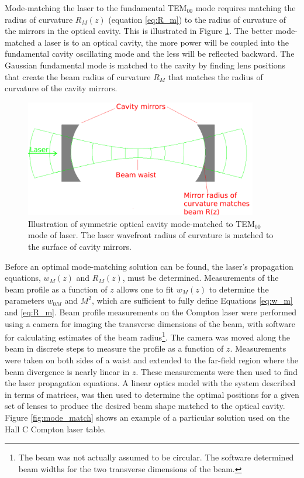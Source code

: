 Mode-matching the laser to the fundamental TEM$_{00}$ mode requires matching the radius of curvature $R_M(z)$ (equation \ref{eq:R_m}) to the radius of curvature of the mirrors in the optical cavity. This is illustrated in Figure \ref{fig:mode_matching}. The better mode-matched a laser is to an optical cavity, the more power will be coupled into the fundamental cavity oscillating mode and the less will be reflected backward. The Gaussian fundamental mode is matched to the cavity by finding lens positions that create the beam radius of curvature $R_M$ that matches the radius of curvature of the cavity mirrors.

\begin{figure}
\begin{center}
\includegraphics[width=4in]{./Pictures/mode_matching}
\end{center}
\caption{\label{fig:mode_matching}Illustration of symmetric optical cavity mode-matched to TEM$_{00}$ mode of laser. The laser wavefront radius of curvature is matched to the surface of cavity mirrors.}
\end{figure}

Before an optimal mode-matching solution can be found, the laser's propagation equations, $w_M(z)$ and $R_M(z)$, must be determined. Measurements of the beam profile as a function of $z$ allows one to fit $w_M(z)$ to determine the parameters $w_{0M}$ and $M^2$, which are sufficient to fully define Equations \ref{eq:w_m} and \ref{eq:R_m}. Beam profile measurements on the Compton laser were performed using a camera for imaging the transverse dimensions of the beam, with software for calculating estimates of the beam radius\footnote{The beam was not actually assumed to be circular. The software determined beam widths for the two transverse dimensions of the beam.}. The camera was moved along the beam in discrete steps to measure the profile as a function of $z$. Measurements were taken on both sides of a waist and extended to the far-field region where the beam divergence is nearly linear in $z$. These measurements were then used to find the laser propagation equations. A linear optics model with the system described in terms of matrices\cite{Kogelnik}, was then used to determine the optimal positions for a given set of lenses to produce the desired beam shape matched to the optical cavity. Figure \ref{fig:mode_match} shows an example of a particular solution used on the Hall C Compton laser table. 

